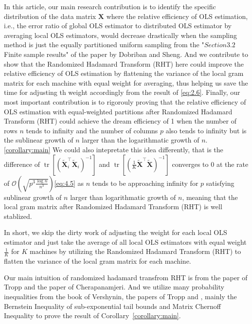 \documentclass[11pt]{article}
\numberwithin{equation}{section}
\theoremstyle{plain}
\theoremstyle{definition}
\theoremstyle{remark}
\begin{document}
In this article, our main research contribution is to identify the specific distribution of the data matrix $\mathbf{X}$ where the relative efficiency of OLS estimation, i.e., the error ratio of global OLS estimator to distributed OLS estimator by averaging local OLS estimators, would decrease drastically when the sampling method is just the equally partitioned uniform sampling from the "$Section 3.2$ Finite sample results" of the paper by Dobriban and Sheng\cite{dobriban2022distributedlinearregressionaveraging}.
And we contribute to show that the Randomized Hadamard Transform (RHT) here could improve the relative efficiency of OLS estimation by flattening the variance of the local gram matrix for each machine with equal weight for averaging, thus helping us save the time for adjusting th weight accordingly from the result of \ref{eq:2.6}. Finally, our most important contribution is to rigorouly proving that the relative efficiency of OLS estimation with equal-weighted partitions after Randomized Hadamard Transform (RHT) could achieve the dream efficiency of 1 when the number of rows $n$ tends to infinity and the number of columns $p$ also tends to infinity but is the sublinear growth of $n$ larger than the logarithmatic growth of $n$.\ref{corollary:main}
We could also intepretate this idea differently, that is the difference of $\operatorname{tr}[(\tilde{\mathbf{X}}_i^{\top}\tilde{\mathbf{X}}_i)^{-1}]$ and $\operatorname{tr}[(\frac{1}{K}\tilde{\mathbf{X}}^{\top}\tilde{\mathbf{X}})^{-1}]$ converges to $0$ at the rate of $\mathcal{O}(\sqrt{p^{3}\frac{\log n}{n^{3}}})$\ref{eq:4.5} as $n$ tends to be approaching infinity for $p$ satisfying sublinear growth of $n$ larger than logarithmatic growth of $n$, meaning that the local gram matrix after Randomized Hadamard Transform (RHT) is well stablized.

In short, we skip the dirty work of adjusting the weight for each local OLS estimator and just take the average of all local OLS estimators with equal weight $\frac{1}{K}$ for $K$ machines by utilizing the Randomized Hadamard Transform (RHT) to flatten the variance of the local gram matrix for each machine.

Our main intuition of randomized hadamard transfrom {RHT} is from the paper of Tropp\cite{tropp2011improvedanalysissubsampledrandomized} and the paper of Cherapanamjeri\cite{cherapanamjeri2022uniformapproximationsrandomizedhadamard}. And we utilize many probability inequalities from the book of Vershynin\cite{vershynin2018high}, the papers of Tropp\cite{tropp2011improvedanalysissubsampledrandomized} and \cite{Tropp_2011}, mainly the Bernstein Inequality of sub-exponential tail bounds and Matrix Chernoff Inequality to prove the result of Corollary~\ref{corollary:main}.
\end{document}

